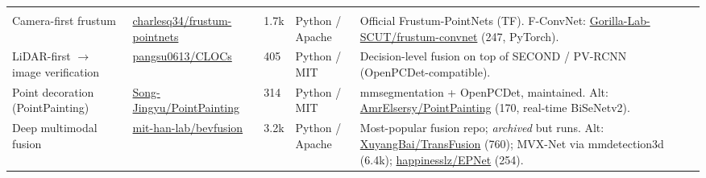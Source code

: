 \documentclass[10pt,a4paper]{article}
\begin{document}
\begin{landscape}
\begin{longtable}{@{}R{3.5cm} R{5.0cm} R{1.2cm} R{2.7cm} R{9.6cm}@{}}
\\
Camera-first frustum &
\href{https://github.com/charlesq34/frustum-pointnets}{charlesq34/frustum-pointnets} & 1.7k & Python / Apache &
Official Frustum-PointNets (TF). F-ConvNet: \href{https://github.com/Gorilla-Lab-SCUT/frustum-convnet}{Gorilla-Lab-SCUT/frustum-convnet} (247, PyTorch).\\

LiDAR-first $\to$ image verification &
\href{https://github.com/pangsu0613/CLOCs}{pangsu0613/CLOCs} & 405 & Python / MIT &
Decision-level fusion on top of SECOND / PV-RCNN (OpenPCDet-compatible).\\

Point decoration (PointPainting) &
\href{https://github.com/Song-Jingyu/PointPainting}{Song-Jingyu/PointPainting} & 314 & Python / MIT &
mmsegmentation + OpenPCDet, maintained. Alt: \href{https://github.com/AmrElsersy/PointPainting}{AmrElsersy/PointPainting} (170, real-time BiSeNetv2).\\

Deep multimodal fusion &
\href{https://github.com/mit-han-lab/bevfusion}{mit-han-lab/bevfusion} & 3.2k & Python / Apache &
Most-popular fusion repo; \emph{archived} but runs. Alt: \href{https://github.com/XuyangBai/TransFusion}{XuyangBai/TransFusion} (760); MVX-Net via mmdetection3d (6.4k); \href{https://github.com/happinesslz/EPNet}{happinesslz/EPNet} (254).\\

\end{longtable}
\end{landscape}

\end{document}

